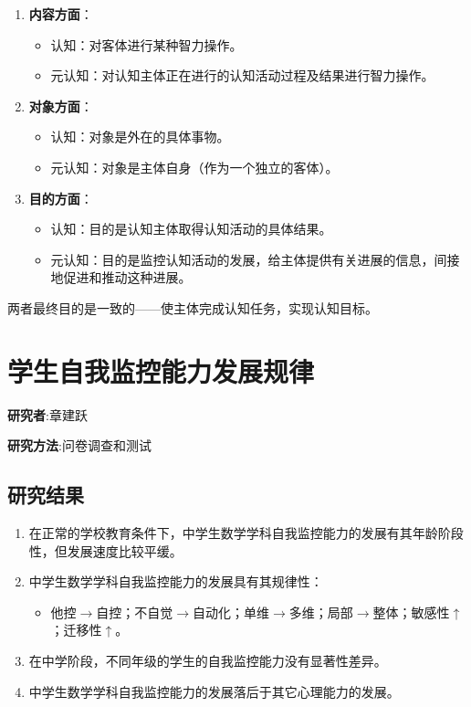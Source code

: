 \begin{enumerate}
    \item \textbf{内容方面}：
    \begin{itemize}
        \item 认知：对客体进行某种智力操作。
        \item 元认知：对认知主体正在进行的认知活动过程及结果进行智力操作。
    \end{itemize}
    
    \item \textbf{对象方面}：
    \begin{itemize}
        \item 认知：对象是外在的具体事物。
        \item 元认知：对象是主体自身（作为一个独立的客体）。
    \end{itemize}
    
    \item \textbf{目的方面}：
    \begin{itemize}
        \item 认知：目的是认知主体取得认知活动的具体结果。
        \item 元认知：目的是监控认知活动的发展，给主体提供有关进展的信息，间接地促进和推动这种进展。
    \end{itemize}
\end{enumerate}

\noindent 两者最终目的是一致的——使主体完成认知任务，实现认知目标。



\section{学生自我监控能力发展规律}

\textbf{研究者}:章建跃

\textbf{研究方法}:问卷调查和测试

\subsection*{研究结果}
\begin{enumerate}
    \item 在正常的学校教育条件下，中学生数学学科自我监控能力的发展有其年龄阶段性，但发展速度比较平缓。
    \item 中学生数学学科自我监控能力的发展具有其规律性：
    \begin{itemize}
        \item 他控$\xrightarrow{}$自控；不自觉$\xrightarrow{}$自动化；单维$\xrightarrow{}$多维；局部$\xrightarrow{}$整体；敏感性$\uparrow$；迁移性$\uparrow$。
    \end{itemize}
    \item 在中学阶段，不同年级的学生的自我监控能力没有显著性差异。
    \item 中学生数学学科自我监控能力的发展落后于其它心理能力的发展。
\end{enumerate}

